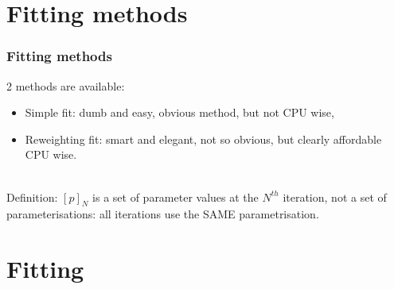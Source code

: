 \documentclass[handout]{beamer}
\begin{document}
\section{Fitting methods}
\begin{frame}
\frametitle{Fitting methods}
2 methods are available:
\begin{itemize}
\item Simple fit: dumb and easy, obvious method, but not CPU wise,
\item Reweighting fit: smart and elegant, not so obvious, but clearly affordable CPU wise.
\end{itemize}
~\\
Definition: \alert{$[p]_N$ is a set of parameter values} at the $N^{th}$
iteration, not a set of parameterisations: all iterations use the SAME
parametrisation.
\end{frame}
\section{Fitting}
\end{document}
